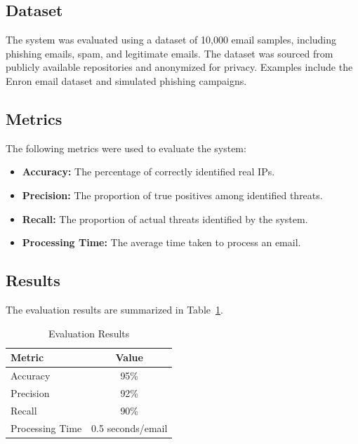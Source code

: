 \documentclass[conference]{IEEEtran}
\begin{document}
\subsection{Dataset}
The system was evaluated using a dataset of 10,000 email samples, including phishing emails, spam, and legitimate emails. The dataset was sourced from publicly available repositories and anonymized for privacy. Examples include the Enron email dataset and simulated phishing campaigns.

\subsection{Metrics}
The following metrics were used to evaluate the system:
\begin{itemize}
    \item \textbf{Accuracy:} The percentage of correctly identified real IPs.
    \item \textbf{Precision:} The proportion of true positives among identified threats.
    \item \textbf{Recall:} The proportion of actual threats identified by the system.
    \item \textbf{Processing Time:} The average time taken to process an email.
\end{itemize}

\subsection{Results}
The evaluation results are summarized in Table~\ref{tab:results}.
\begin{table}[h!]
    \centering
    \begin{tabular}{|l|c|}
        \hline
        \textbf{Metric} & \textbf{Value} \\
        \hline
        Accuracy & 95\% \\
        Precision & 92\% \\
        Recall & 90\% \\
        Processing Time & 0.5 seconds/email \\
        \hline
    \end{tabular}
    \caption{Evaluation Results}
    \label{tab:results}
\end{table}
\end{document}
